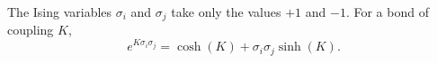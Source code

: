 \documentclass{article}
\begin{document}
The Ising variables $\sigma_i$ and $\sigma_j$ take only the values $+1$ and $-1$. For a bond of coupling $K$,
\begin{equation}
e^{K\sigma_i\sigma_j} = \cosh(K) + \sigma_i\sigma_j \sinh(K) .
\label{eq:ht}
\end{equation}
\end{document}
